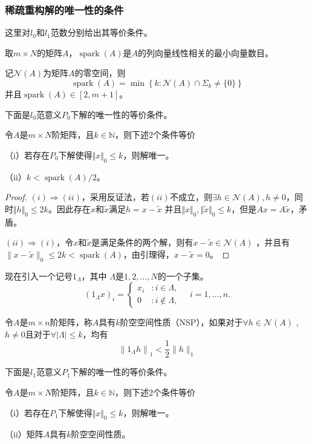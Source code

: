 \subsubsection{稀疏重构解的唯一性的条件}
这里对$l_0$和$l_1$范数分别给出其等价条件。
\begin{definition}
    取$m\times N$的矩阵$A$，$ \operatorname{spark}(A)$是$A$的列向量线性相关的最小向量数目。
\end{definition}
\begin{lemma}
    记$\mathcal{N}(A)$为矩阵$A$的零空间，则
   \begin{equation}
    \operatorname{spark}(A)=\min \left\{k: \mathcal{N}(A) \cap \Sigma_k \neq\{0\}\right\}
   \end{equation}
   并且$\operatorname{spark}(A) \in[2,m+1]$。
\end{lemma}
下面是$l_0$范意义$P_0$下解的唯一性的等价条件。
\begin{theorem}
    令$A$是$m\times N$阶矩阵，且$k \in \mathbb{N}$，则下述2个条件等价\par
    （i）若存在$P_0$下解使得$\Vert x \Vert_0 \le k$，则解唯一。\par
    （ii）$k<\operatorname{spark}(A)/2 $。
\end{theorem}
\begin{proof}
    $(i)\Rightarrow (ii)$，采用反证法，若$(ii)$不成立，则$\exists h \in \mathcal{N}(A)
    ,h\neq 0$，同时$\Vert h \Vert_0 \le 2k$。因此存在$x$和$\tilde{x}$满足$h=x-\tilde{x}$
    并且$\Vert x \Vert_0 ,\Vert \tilde{x} \Vert_0 \le k$，但是$Ax=A\tilde{x}$，矛盾。\par
    $(ii)\Rightarrow (i)$，令$x$和$\tilde{x}$是满足条件的两个解，则有$x-\tilde{x}\in \mathcal{N}(A)$
    ，并且有$\|x-\tilde{x}\|_0 \leq 2 k<\operatorname{spark}(A)$，由引理得，$x-\tilde{x}=0$。
\end{proof}
现在引入一个记号$1_{\Lambda}$，其中 $\Lambda$是${1,2,\ldots,N}$的一个子集。
\begin{equation}
    \left(1_{\Lambda} x\right)_i=\left\{ \begin{array}{rl}
    x_i & : i \in \Lambda,\\
    0 & : i \notin \Lambda,
    \end{array} \quad i=1,\ldots, n .\right .
\end{equation}
\begin{definition}
    令$A$是$m\times n$阶矩阵，称$A$具有$k$阶空空间性质（NSP），如果对于$\forall h \in \mathcal{N}(A)$
    ,$h \neq 0$且对于$\forall |\Lambda| \leq k$，均有
    \begin{equation}
        \left\|1_{\Lambda} h\right\|_1<\frac{1}{2}\|h\|_1
    \end{equation}
\end{definition}
下面是$l_1$范意义$P_1$下解的唯一性的等价条件。
\begin{theorem}
    令$A$是$m\times N$阶矩阵，且$k \in \mathbb{N}$，则下述2个条件等价\par
    （i）若存在$P_1$下解使得$\Vert x \Vert_0 \le k$，则解唯一。\par
    （ii）矩阵$A$具有$k$阶空空间性质。
\end{theorem}


